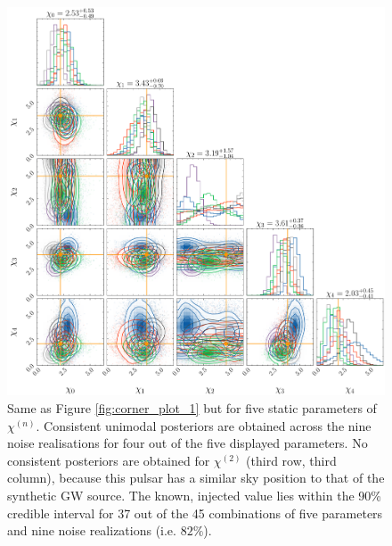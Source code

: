 \documentclass[fleqn,usenatbib,useAMS]{mnras}
\begin{document}
	\begin{figure}
	\includegraphics[width=\columnwidth, height =\columnwidth ]{images/corner_lowSNR_chi}
	\caption{Same as Figure \ref{fig:corner_plot_1}	but for five static parameters of $\chi^{(n)}$. Consistent unimodal posteriors are obtained across the nine noise realisations for four out of the five displayed parameters. No consistent posteriors are obtained for $\chi^{(2)}$ (third row, third column), because this pulsar has a similar sky position to that of the synthetic GW source. The known, injected value lies within the 90\% credible interval for 37 out of the 45 combinations of five parameters and nine noise realizations (i.e. $82 \%$). }
	\label{fig:corner_plot_3}
\end{figure}
\end{document}
